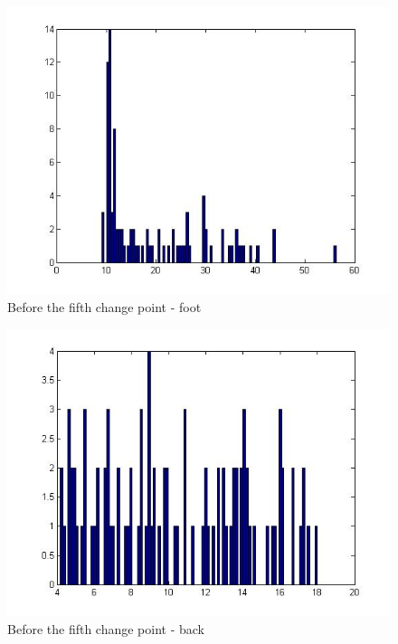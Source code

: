 \documentclass[french]{article}
\begin{document}
\begin{figure}[h]
	\includegraphics[scale=0.7]{hist1_1-foot.jpg}
	\caption{Before the fifth change point - foot}
\end{figure}

\begin{figure}[h]
	\includegraphics[scale=0.7]{hist2_1-back.jpg}
	\caption{Before the fifth change point - back}
\end{figure}
\end{document}

